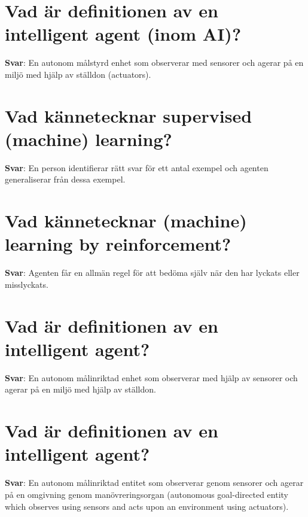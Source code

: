 \documentclass[a4paper,11pt,oneside]{book}
\begin{document}
\begin{sloppypar}
\section{Vad \"ar definitionen av en intelligent agent (inom AI)?}

\label{q:323:sa:sv:True}

\textbf{Svar}: En autonom m\r{a}lstyrd enhet som observerar med sensorer och agerar p\r{a} en milj\"o med hj\"alp av st\"alldon (actuators).



\section{Vad k\"annetecknar supervised (machine) learning?}

\label{q:324:sa:sv:True}

\textbf{Svar}: En person identifierar r\"att svar f\"or ett antal exempel och agenten generaliserar fr\r{a}n dessa exempel.



\section{Vad k\"annetecknar (machine) learning by reinforcement?}

\label{q:325:sa:sv:True}

\textbf{Svar}: Agenten f\r{a}r en allm\"an regel f\"or att bed\"oma sj\"alv n\"ar den har lyckats eller misslyckats.



\section{Vad \"ar definitionen av en intelligent agent?}

\label{q:326:sa:sv:True}

\textbf{Svar}: En autonom m\r{a}linriktad enhet som observerar med hj\"alp av sensorer och agerar p\r{a} en milj\"o med hj\"alp av st\"alldon.



\section{Vad \"ar definitionen av en intelligent agent?}

\label{q:327:sa:sv:True}

\textbf{Svar}: En autonom m\r{a}linriktad entitet som observerar genom sensorer och agerar p\r{a} en omgivning genom man\"ovreringsorgan (autonomous goal-directed entity which observes using sensors and acts upon an environment using actuators).




\end{sloppypar}
\end{document}
